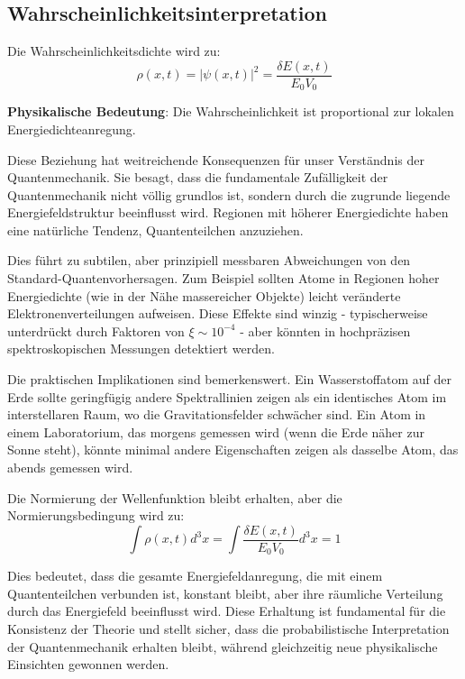 \documentclass[12pt,a4paper]{article}
\newcommand{\deltaE}{\delta E}
\newcommand{\xipar}{\xi}
\theoremstyle{definition}
\theoremstyle{remark}
\begin{document}
\subsection{Wahrscheinlichkeitsinterpretation}

Die Wahrscheinlichkeitsdichte wird zu:
\begin{equation}
	\rho(x,t) = |\psi(x,t)|^2 = \frac{\deltaE(x,t)}{E_0 V_0}
	\label{eq:probability_density}
\end{equation}

\textbf{Physikalische Bedeutung}: Die Wahrscheinlichkeit ist proportional zur lokalen Energiedichteanregung.

Diese Beziehung hat weitreichende Konsequenzen für unser Verständnis der Quantenmechanik. Sie besagt, dass die fundamentale Zufälligkeit der Quantenmechanik nicht völlig grundlos ist, sondern durch die zugrunde liegende Energiefeldstruktur beeinflusst wird. Regionen mit höherer Energiedichte haben eine natürliche Tendenz, Quantenteilchen anzuziehen.

Dies führt zu subtilen, aber prinzipiell messbaren Abweichungen von den Standard-Quantenvorhersagen. Zum Beispiel sollten Atome in Regionen hoher Energiedichte (wie in der Nähe massereicher Objekte) leicht veränderte Elektronenverteilungen aufweisen. Diese Effekte sind winzig - typischerweise unterdrückt durch Faktoren von $\xipar \sim 10^{-4}$ - aber könnten in hochpräzisen spektroskopischen Messungen detektiert werden.

Die praktischen Implikationen sind bemerkenswert. Ein Wasserstoffatom auf der Erde sollte geringfügig andere Spektrallinien zeigen als ein identisches Atom im interstellaren Raum, wo die Gravitationsfelder schwächer sind. Ein Atom in einem Laboratorium, das morgens gemessen wird (wenn die Erde näher zur Sonne steht), könnte minimal andere Eigenschaften zeigen als dasselbe Atom, das abends gemessen wird.

Die Normierung der Wellenfunktion bleibt erhalten, aber die Normierungsbedingung wird zu:
$$\int \rho(x,t) d^3x = \int \frac{\deltaE(x,t)}{E_0 V_0} d^3x = 1$$

Dies bedeutet, dass die gesamte Energiefeldanregung, die mit einem Quantenteilchen verbunden ist, konstant bleibt, aber ihre räumliche Verteilung durch das Energiefeld beeinflusst wird. Diese Erhaltung ist fundamental für die Konsistenz der Theorie und stellt sicher, dass die probabilistische Interpretation der Quantenmechanik erhalten bleibt, während gleichzeitig neue physikalische Einsichten gewonnen werden.
\end{document}
